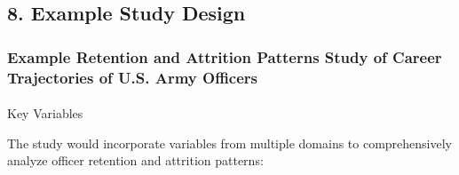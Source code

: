 \documentclass[./main.tex]{subfiles}
\makeatletter
\let\oldparagraph\paragraph
\renewcommand{\paragraph}{
    \@ifstar
      \xxxParagraphStar
      \xxxParagraphNoStar
  }
\newcommand{\xxxParagraphStar}[1]{\oldparagraph*{#1}\mbox{}}
\newcommand{\xxxParagraphNoStar}[1]{\oldparagraph{#1}\mbox{}}
\makeatother
\begin{document}
\subsection{8. Example Study Design}\label{example-study-design}

\subsubsection{Example Retention and Attrition Patterns Study of Career
Trajectories of U.S. Army
Officers}\label{example-retention-and-attrition-patterns-study-of-career-trajectories-of-u.s.-army-officers}

\paragraph{Key Variables}\label{key-variables}

The study would incorporate variables from multiple domains to
comprehensively analyze officer retention and attrition patterns:
\end{document}
